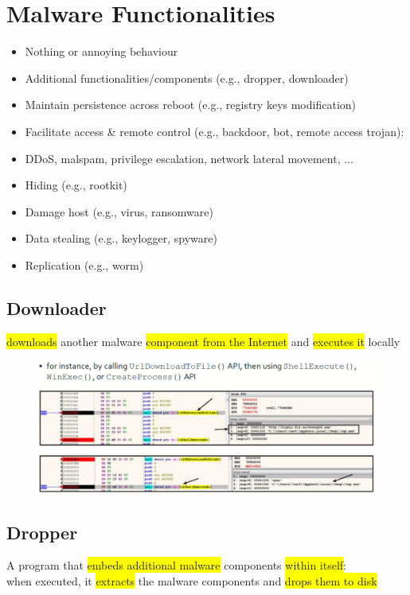\documentclass[]{project_plan}
\begin{document}
\section{Malware Functionalities}

\begin{itemize}
  \item Nothing or annoying behaviour
  \item Additional functionalities/components (e.g., dropper, downloader)
  \item Maintain persistence across reboot (e.g., registry keys modification)
  \item Facilitate access \& remote control (e.g., backdoor, bot, remote access trojan):
  \item DDoS, malspam, privilege escalation, network lateral movement, ...
  \item Hiding (e.g., rootkit)
  \item Damage host (e.g., virus, ransomware)
  \item Data stealing (e.g., keylogger, spyware)
  \item Replication (e.g., worm)
\end{itemize}

\subsection{Downloader}
\colorbox{yellow}{downloads} another malware \colorbox{yellow}{component from the Internet} and \colorbox{yellow}{executes it} locally

\begin{figure}[H]
  \centering
  \includegraphics[width=\linewidth]{downloader.png}
\end{figure}

\subsection{Dropper}
A program that \colorbox{yellow}{embeds additional malware} components \colorbox{yellow}{within itself}:\\
when executed, it \colorbox{yellow}{extracts} the malware components and \colorbox{yellow}{drops them to disk}
\end{document}
